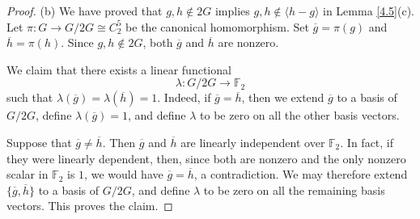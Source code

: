 \documentclass[a4paper, 10pt]{amsart}
\theoremstyle{plain}
\theoremstyle{definition}
\numberwithin{equation}{section}
\begin{document}
{\begin{proof}
(b)
	We have proved that $g,h\notin 2G$ implies $g,h\notin \langle h-g \rangle$ in Lemma \ref{4.5}(c).
	Let $
	\pi \colon G \longrightarrow G/2G \cong C_2^5$ 
	be the canonical homomorphism. 
	Set $
	\overline g=\pi(g)$ and $\overline h=\pi(h)$.
	Since $g,h\notin 2G$, both $\overline g$ and $\overline h$
	are nonzero.
	
	We claim that there exists a linear functional
	\[
	\lambda\colon G/2G\longrightarrow \mathbb F_2
	\]
	such that $
	\lambda(\overline g)=\lambda(\overline h)=1.$
	Indeed, if $\overline g=\overline h$, then we extend
	$\overline g$ to a basis of $G/2G$, define $\lambda(\overline g)=1$,
	and define $\lambda$ to be zero on all the other basis vectors.
	
	Suppose that $\overline g\neq\overline h$. Then
	$\overline g$ and $\overline h$ are linearly independent over
	$\mathbb F_2$. In fact, if they were linearly dependent, then,
	since both are nonzero and the only nonzero scalar in $\mathbb F_2$
	is $1$, we would have $\overline g=\overline h$, a contradiction.
	We may therefore extend
	$\{\overline g,\overline h\}$ to a basis of $G/2G$, 
	and define $\lambda$ to be zero on all the remaining basis vectors.
	This proves the claim.
	

\end{proof}}
\end{document}
